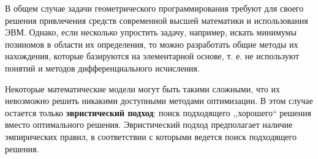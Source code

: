 В общем случае задачи геометрического программирования требуют для
своего решения привлечения средств современной высшей математики и
использования ЭВМ. Однако, если несколько упростить задачу, например,
искать минимумы позиномов в области их определения, то можно
разработать общие методы их нахождения, которые базируются на
элементарной основе, т. е. не используют понятий и методов
дифференциального исчисления.

Некоторые математические модели могут быть такими сложными, что их
невозможно решить никакими доступными методами оптимизации. В этом
случае остается только \textbf{эвристический подход}: поиск подходящего
,,хорошего`` решения вместо оптимального решения. Эвристический подход
предполагает наличие эмпирических правил, в соответствии с которыми
ведется поиск подходящего решения.

\pagebreak